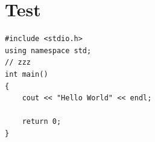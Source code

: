 \section{Test}

\begin{verbatim}
#include <stdio.h>
using namespace std;
// zzz
int main()
{
    cout << "Hello World" << endl;
    
    return 0;
}
\end{verbatim}
